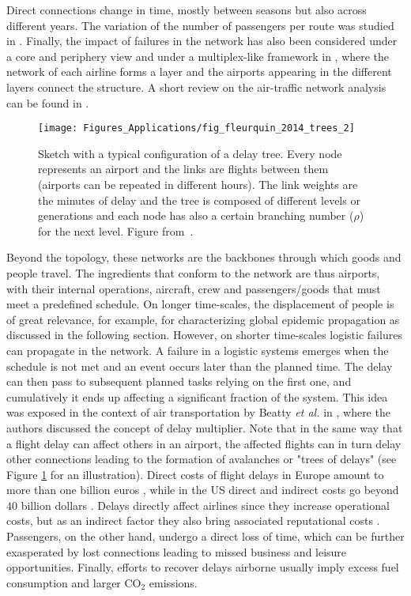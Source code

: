 Direct connections change in time, mostly between seasons but also across different years. The variation of the number of passengers per route was studied in \cite{gautreau_2009_microdynamics,zhang_2010_evolution}. Finally, the impact of failures in the network has also been considered under a core and periphery view \cite{verma_2014_revealing} and under a multiplex-like framework in \cite{cardillo_2013_modeling}, where the network of each airline forms a layer and the airports appearing in the different layers connect the structure. A short review on the air-traffic network analysis can be found in \cite{zanin_2013_modelling}.

\begin{figure}
\centering
\texttt{[image: Figures\_Applications/fig\_fleurquin\_2014\_trees\_2]}
\caption{Sketch with a typical configuration of a delay tree. Every node represents an airport and the links are flights between them (airports can be repeated in different hours). The link weights are the minutes of delay and the tree is composed of different levels or generations and each node has also a certain branching number ($\rho$) for the next level.  Figure from~\cite{fleurquin_2014_trees}. \label{fig:fleurquin_2014_trees_2}}
\end{figure}

Beyond the topology, these networks are the backbones through which goods and people travel. The ingredients that conform to the network are thus airports, with their internal operations, aircraft, crew and passengers/goods that must meet a predefined schedule. On longer time-scales, the displacement of people is of great relevance, for example, for characterizing global epidemic propagation \cite{hufnagel_2004_forecast} as discussed in the following section. However, on shorter time-scales logistic failures can propagate in the network. A failure in a logistic systems emerges when the schedule is not met and an event occurs later than the planned time. The delay can then pass to subsequent planned tasks relying on the first one, and cumulatively it ends up affecting a significant fraction of the system. This idea was exposed in the context of air transportation by Beatty {\it et al.} in \cite{beatty_1998_preliminary}, where the authors discussed the concept of delay multiplier. Note that in the same way that a flight delay can affect others in an airport, the affected flights can in turn delay other connections leading to the formation of avalanches or "trees of delays" \cite{fleurquin_2014_trees} (see Figure \ref{fig:fleurquin_2014_trees_2} for an illustration). Direct costs of flight delays in Europe amount to more than one billion euros \cite{cook_2011_european}, while in the US direct and indirect costs go beyond $40$ billion dollars \cite{joint_2008_your}. Delays directly affect airlines since they increase operational costs, but as an indirect factor they also bring associated reputational costs \cite{folkes_1987_field,mayer_2003_network}. Passengers, on the other hand, undergo a direct loss of time, which can be further exasperated by lost connections leading to missed business and leisure opportunities. Finally, efforts to recover delays airborne usually imply excess fuel consumption and larger CO$_2$ emissions. 

